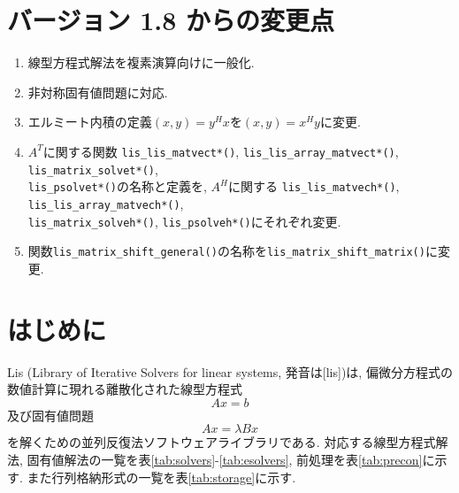 \documentclass[a4paper]{jarticle}
\begin{document}
\section*{バージョン 1.8 からの変更点}
\begin{enumerate}
\item 線型方程式解法を複素演算向けに一般化.
\item 非対称固有値問題に対応.
\item エルミート内積の定義$(x,y)=y^{H}x$を$(x,y)=x^{H}y$に変更.
\item $A^T$に関する関数
      {\tt lis\_lis\_matvect*()}, 
      {\tt lis\_lis\_array\_matvect*()}, 
      {\tt lis\_matrix\_solvet*()}, \\
      {\tt lis\_psolvet*()}の名称と定義を, $A^H$に関する
      {\tt lis\_lis\_matvech*()}, 
      {\tt lis\_lis\_array\_matvech*()}, \\  
      {\tt lis\_matrix\_solveh*()}, 
      {\tt lis\_psolveh*()}にそれぞれ変更.
\item 関数{\tt lis\_matrix\_shift\_general()}の名称を{\tt lis\_matrix\_shift\_matrix()}に変更. 
\end{enumerate}

\newpage
\section{はじめに}
Lis (Library of Iterative Solvers for linear systems, 発音は[lis])は, 
偏微分方程式の数値計算に現れる離散化された線型方程式 
\[
Ax = b
\]
及び固有値問題
\[
Ax = \lambda Bx
\]
を解くための並列反復法ソフトウェアライブラリである\cite{nishida1}. 
対応する線型方程式解法, 固有値解法の一覧を表\ref{tab:solvers}-\ref{tab:esolvers}, 
前処理を表\ref{tab:precon}に示す. 
また行列格納形式の一覧を表\ref{tab:storage}に示す. 
\end{document}
